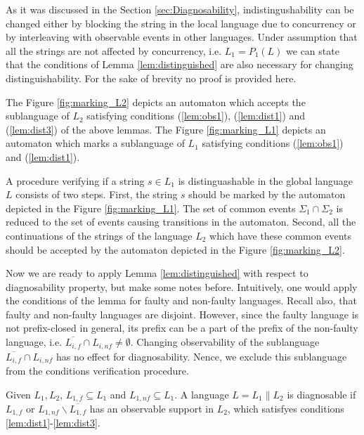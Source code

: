\documentclass[a4paper, 10pt, conference]{ieeeconf}
\begin{document}
As it was discussed in the Section \ref{sec:Diagnosability}, indistingushability
can be changed either by blocking the string in the local language due to
concurrency or by interleaving with observable events in other languages. Under
assumption that all the strings are not affected by concurrency, i.e. $L_1 =
P_1(L)$ we can state that the conditions of Lemma \ref{lem:distinguished} are
also necessary for changing distinguishability. For the sake of brevity no proof is
provided here.

The Figure \ref{fig:marking_L2} depicts an automaton which
accepts the sublanguage of $L_2$ satisfying conditions (\ref{lem:obs1}),
(\ref{lem:dist1}) and (\ref{lem:dist3}) of the above lemmas.
The Figure \ref{fig:marking_L1} depicts an automaton which
marks a sublanguage of $L_1$ satisfying conditions (\ref{lem:obs1}) and
(\ref{lem:dist1}). 

A procedure verifying if a string $s \in L_1$ is distinguashable in the global
language $L$ consists of two steps. First, the string $s$ should be marked by
the automaton depicted in the Figure \ref{fig:marking_L1}. The set of common
events $\Sigma_1 \cap \Sigma_2$ is reduced to the set of events causing
transitions in the automaton. Second, all the continuations of the strings of
the language $L_2$ which have these common events should be accepted by the
automaton depicted in the Figure
\ref{fig:marking_L2}.

Now we are ready to apply Lemma \ref{lem:distinguished} with respect to
diagnosability property, but make some notes before. Intuitively, one
would apply the conditions of the lemma for faulty and non-faulty
languages. Recall also, that faulty and non-faulty languages are disjoint.
However, since the faulty language is not prefix-closed in general, its prefix
can be a part of the prefix of the non-faulty language, i.e. $\overline{L_{i,f}}
\cap L_{i,nf} \neq \emptyset$. Changing observability of the
sublanguage $\overline{L_{i,f}} \cap L_{i,nf}$ has no effect for diagnosability.
Nence, we exclude this sublanguage from the conditions verification
procedure.

\begin{lemma}
\label{lem:diagnosable}
Given $L_1, L_2$, $L_{1,f} \subseteq L_1$ and $L_{1,nf} \subseteq L_1$. A
language $L = L_1 \parallel L_2$ is diagnosable if $L_{1,f}$ or $L_{1,nf}
\backslash \overline{L_{1,f}}$ has an observable support in $L_2$, which
satisfyes conditions \ref{lem:dist1}-\ref{lem:dist3}.
\end{lemma}
\end{document}
